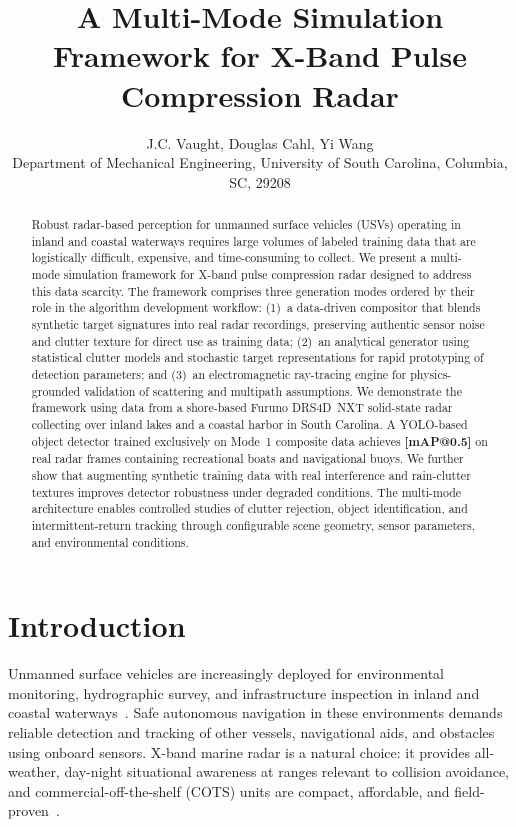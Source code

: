 \documentclass[twocolumn, 10pt]{article}
\title{A Multi-Mode Simulation Framework for X-Band Pulse Compression Radar}
\author{J.C. Vaught, Douglas Cahl, Yi Wang\\
\small Department of Mechanical Engineering, University of South Carolina, Columbia, SC, 29208}
\newcommand{\ph}[1]{\textbf{[#1]}}
\begin{document}
\maketitle

\begin{abstract}
Robust radar-based perception for unmanned surface vehicles (USVs) operating in inland and coastal waterways requires large volumes of labeled training data that are logistically difficult, expensive, and time-consuming to collect. We present a multi-mode simulation framework for X-band pulse compression radar designed to address this data scarcity. The framework comprises three generation modes ordered by their role in the algorithm development workflow: (1)~a data-driven compositor that blends synthetic target signatures into real radar recordings, preserving authentic sensor noise and clutter texture for direct use as training data; (2)~an analytical generator using statistical clutter models and stochastic target representations for rapid prototyping of detection parameters; and (3)~an electromagnetic ray-tracing engine for physics-grounded validation of scattering and multipath assumptions. We demonstrate the framework using data from a shore-based Furuno DRS4D~NXT solid-state radar collecting over inland lakes and a coastal harbor in South Carolina. A YOLO-based object detector trained exclusively on Mode~1 composite data achieves \ph{mAP@0.5} on real radar frames containing recreational boats and navigational buoys. We further show that augmenting synthetic training data with real interference and rain-clutter textures improves detector robustness under degraded conditions. The multi-mode architecture enables controlled studies of clutter rejection, object identification, and intermittent-return tracking through configurable scene geometry, sensor parameters, and environmental conditions.
\end{abstract}

\section{Introduction}
\label{sec:intro}

Unmanned surface vehicles are increasingly deployed for environmental monitoring, hydrographic survey, and infrastructure inspection in inland and coastal waterways~\cite{han2023maritime}. Safe autonomous navigation in these environments demands reliable detection and tracking of other vessels, navigational aids, and obstacles using onboard sensors. X-band marine radar is a natural choice: it provides all-weather, day-night situational awareness at ranges relevant to collision avoidance, and commercial-off-the-shelf (COTS) units are compact, affordable, and field-proven~\cite{skolnik2001introduction}.
\end{document}
